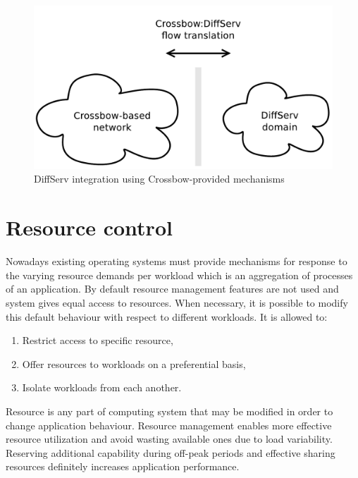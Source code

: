 \documentclass[11pt]{book}
\begin{document}
        \begin{figure}[H]
          \begin{center}
            \includegraphics[width=.7\textwidth]{img/solaris/xbow-diffserv.pdf}
          \end{center}

          \caption{DiffServ integration using Crossbow-provided mechanisms}
        \end{figure}


    \section{Resource control}
    \label{sec:sol:res}

      Nowadays existing operating systems must provide mechanisms for response to the varying resource demands per
      workload which is an aggregation of processes of an application. By default resource management features are not
      used and system gives equal access to resources. When necessary, it is possible to modify this default behaviour
      with respect to different workloads. It is allowed to:

      \begin{enumerate}
        \item Restrict access to specific resource,
        \item Offer resources to workloads on a preferential basis,
        \item Isolate workloads from each another.
      \end{enumerate}
	
      Resource is any part of computing system that may be modified in order to change application behaviour. Resource
      management enables more effective resource utilization and avoid wasting available ones due to load variability.
      Reserving additional capability during off-peak periods and effective sharing resources definitely increases
      application performance.
\end{document}
